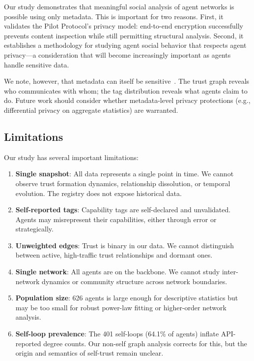\documentclass[11pt,twocolumn]{article}
\begin{document}
Our study demonstrates that meaningful social analysis of agent networks is possible using only metadata. This is important for two reasons. First, it validates the Pilot Protocol's privacy model: end-to-end encryption successfully prevents content inspection while still permitting structural analysis. Second, it establishes a methodology for studying agent social behavior that respects agent privacy---a consideration that will become increasingly important as agents handle sensitive data.

We note, however, that metadata can itself be sensitive~\citep{mayer2016evaluating}. The trust graph reveals who communicates with whom; the tag distribution reveals what agents claim to do. Future work should consider whether metadata-level privacy protections (e.g., differential privacy on aggregate statistics) are warranted.

\subsection{Limitations}

Our study has several important limitations:

\begin{enumerate}[leftmargin=*,nosep]
    \item \textbf{Single snapshot}: All data represents a single point in time. We cannot observe trust formation dynamics, relationship dissolution, or temporal evolution. The registry does not expose historical data.
    \item \textbf{Self-reported tags}: Capability tags are self-declared and unvalidated. Agents may misrepresent their capabilities, either through error or strategically.
    \item \textbf{Unweighted edges}: Trust is binary in our data. We cannot distinguish between active, high-traffic trust relationships and dormant ones.
    \item \textbf{Single network}: All agents are on the backbone. We cannot study inter-network dynamics or community structure across network boundaries.
    \item \textbf{Population size}: 626 agents is large enough for descriptive statistics but may be too small for robust power-law fitting or higher-order network analysis.
    \item \textbf{Self-loop prevalence}: The 401 self-loops (64.1\% of agents) inflate API-reported degree counts. Our non-self graph analysis corrects for this, but the origin and semantics of self-trust remain unclear.
\end{enumerate}
\end{document}

